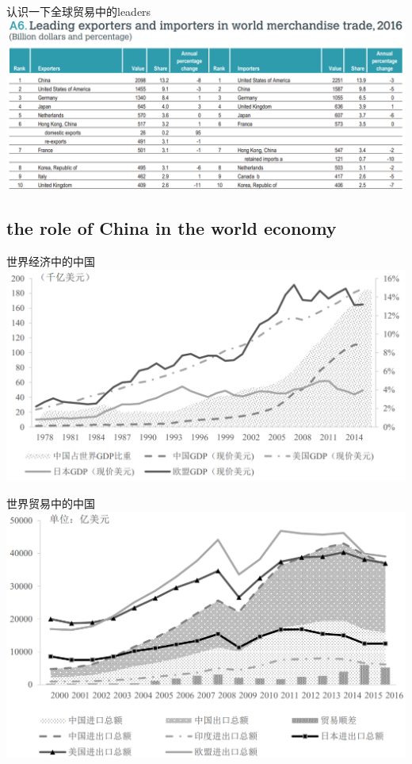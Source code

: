 \documentclass[10pt,hyperref={CJKbookmarks=true},xcolor=dvipsnames,aspectratio=169]{beamer}
\begin{document}
\begin{frame}{认识一下全球贸易中的leaders}
\centering \includegraphics[scale=0.55]{fig/gravity/leaders}
\end{frame}



\subsection[中国在全球贸易中的角色]{the role of China in the world economy}

\begin{frame}{世界经济中的中国}
\centering \includegraphics[scale=0.5]{fig/gravity/china0}

\end{frame}

\begin{frame}{世界贸易中的中国}
\centering \includegraphics[scale=0.4]{fig/gravity/china1}

\end{frame}
\end{document}
